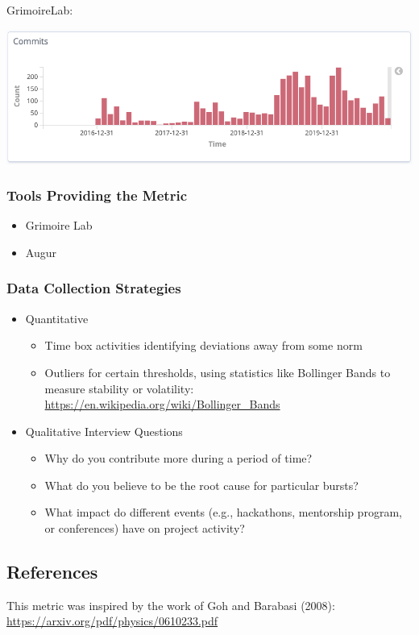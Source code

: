 GrimoireLab:

\includegraphics{images/burstiness_gl.png}

\hypertarget{tools-providing-the-metric}{%
\subsubsection{Tools Providing the
Metric}\label{tools-providing-the-metric}}

\begin{itemize}
\tightlist
\item
  Grimoire Lab
\item
  Augur
\end{itemize}

\hypertarget{data-collection-strategies}{%
\subsubsection{Data Collection
Strategies}\label{data-collection-strategies}}

\begin{itemize}
\tightlist
\item
  Quantitative

  \begin{itemize}
  \tightlist
  \item
    Time box activities identifying deviations away from some norm
  \item
    Outliers for certain thresholds, using statistics like Bollinger
    Bands to measure stability or volatility:
    \url{https://en.wikipedia.org/wiki/Bollinger_Bands}
  \end{itemize}
\item
  Qualitative Interview Questions

  \begin{itemize}
  \tightlist
  \item
    Why do you contribute more during a period of time?
  \item
    What do you believe to be the root cause for particular bursts?
  \item
    What impact do different events (e.g., hackathons, mentorship
    program, or conferences) have on project activity?
  \end{itemize}
\end{itemize}

\hypertarget{references}{%
\subsection{References}\label{references}}

This metric was inspired by the work of Goh and Barabasi (2008):
\url{https://arxiv.org/pdf/physics/0610233.pdf}
